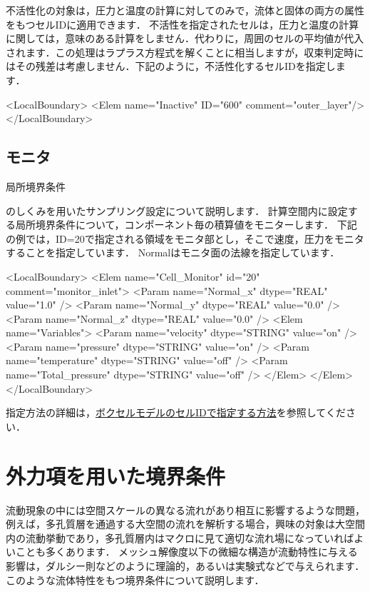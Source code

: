 不活性化の対象は，圧力と温度の計算に対してのみで，流体と固体の両方の属性をもつセルIDに適用できます．
不活性を指定されたセルは，圧力と温度の計算に関しては，意味のある計算をしません．代わりに，周囲のセルの平均値が代入されます．この処理はラプラス方程式を解くことに相当しますが，収束判定時にはその残差は考慮しません．下記のように，不活性化するセルIDを指定します．

{\small
\begin{program}
<LocalBoundary>
  <Elem name="Inactive" ID="600" comment="outer_layer"/>
</LocalBoundary>
\end{program}
}


\subsection{モニタ}
\hypertarget{tgt:localBCmonitor}{局所境界条件}のしくみを用いたサンプリング設定について説明します．
計算空間内に設定する局所境界条件について，コンポーネント毎の積算値をモニターします．
下記の例では，ID=20で指定される領域をモニタ部とし，そこで速度，圧力をモニタすることを指定しています．
Normalはモニタ面の法線を指定しています．

{\small
\begin{program}
<LocalBoundary>
  <Elem name="Cell_Monitor" id="20" comment="monitor_inlet"> 
    <Param name="Normal_x" dtype="REAL" value="1.0" /> 
    <Param name="Normal_y" dtype="REAL" value="0.0" /> 
    <Param name="Normal_z" dtype="REAL" value="0.0" /> 
    <Elem name="Variables"> 
      <Param name="velocity"       dtype="STRING" value="on" /> 
      <Param name="pressure"       dtype="STRING" value="on" /> 
      <Param name="temperature"    dtype="STRING" value="off" /> 
      <Param name="Total_pressure" dtype="STRING" value="off" /> 
    </Elem> 
  </Elem>
</LocalBoundary>
\end{program}
}

指定方法の詳細は，\hyperlink{tgt:cell_monitor}{ボクセルモデルのセルIDで指定する方法}を参照してください．


\hypertarget{tgt:external forcce}{\section{外力項を用いた境界条件}}

流動現象の中には空間スケールの異なる流れがあり相互に影響するような問題，例えば，多孔質層を通過する大空間の流れを解析する場合，興味の対象は大空間内の流動挙動であり，多孔質層内はマクロに見て適切な流れ場になっていればよいことも多くあります．
メッシュ解像度以下の微細な構造が流動特性に与える影響は，ダルシー則などのように理論的，あるいは実験式などで与えられます．
このような流体特性をもつ境界条件について説明します．

